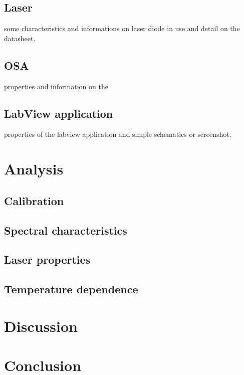 \documentclass[
10pt, %
oneside, %
headinclude,footinclude, %
BCOR5mm, %
]{article}
\begin{document}
\subsection{Laser}
some characteristics and informations on laser diode in use and detail on the datasheet. 

\subsection{OSA}
properties and information on the 
\subsection{LabView application}
properties of the labview application and simple schematics or screenshot. 

\section{Analysis}
\subsection{Calibration}
\subsection{Spectral characteristics}
\subsection{Laser properties}
\subsection{Temperature dependence}

\section{Discussion}


\section{Conclusion}
\end{document}
